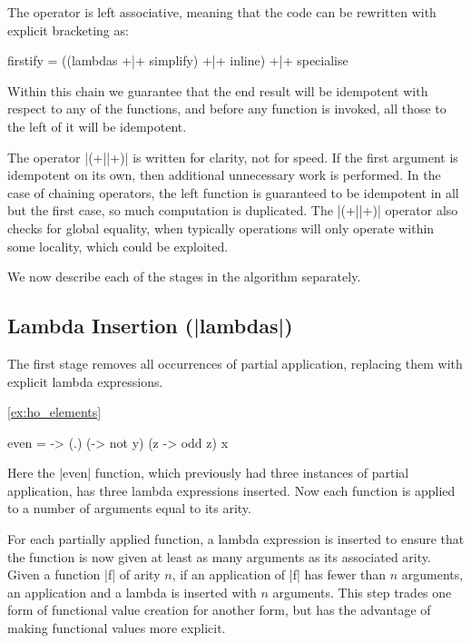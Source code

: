 \documentclass[preprint]{sigplanconf}
\begin{document}
The operator is left associative, meaning that the code can be rewritten with explicit bracketing as:

\begin{code}
firstify = ((lambdas +|+ simplify) +|+ inline) +|+ specialise
\end{code}

Within this chain we guarantee that the end result will be idempotent with respect to any of the functions, and before any function is invoked, all those to the left of it will be idempotent.

The operator |(+||+)| is written for clarity, not for speed. If the first argument is idempotent on its own, then additional unnecessary work is performed. In the case of chaining operators, the left function is guaranteed to be idempotent in all but the first case, so much computation is duplicated. The |(+||+)| operator also checks for global equality, when typically operations will only operate within some locality, which could be exploited.

We now describe each of the stages in the algorithm separately.

\subsection{Lambda Insertion (|lambdas|)}

The first stage removes all occurrences of partial application, replacing them with explicit lambda expressions.

\begin{examplerevisit}{\ref{ex:ho_elements}}
\begin{code}
even = \x -> (.) (\y -> not y) (z -> odd z) x
\end{code}

Here the |even| function, which previously had three instances of partial application, has three lambda expressions inserted. Now each function is applied to a number of arguments equal to its arity.
\end{examplerevisit}

For each partially applied function, a lambda expression is inserted to ensure that the function is now given at least as many arguments as its associated arity. Given a function |f| of arity $n$, if an application of |f| has fewer than $n$ arguments, an application and a lambda is inserted with $n$ arguments. This step trades one form of functional value creation for another form, but has the advantage of making functional values more explicit.
\end{document}
